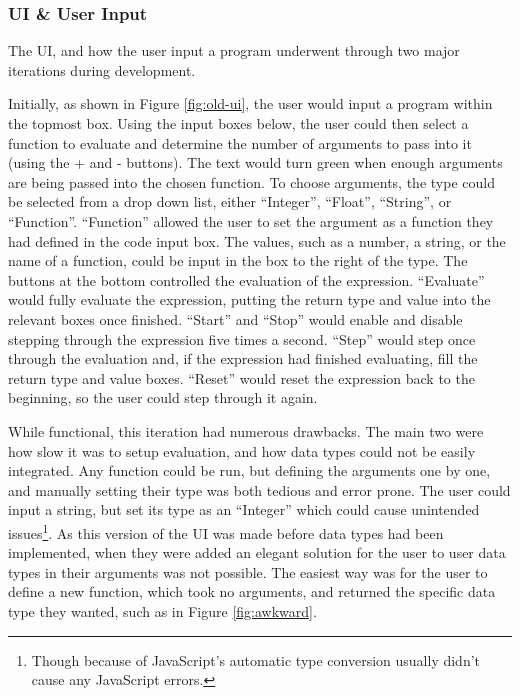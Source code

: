 \subsubsection{UI \& User Input}


The UI, and how the user input a program underwent through two major iterations during development.

Initially, as shown in Figure \ref{fig:old-ui}, the user would input a program within the topmost box. Using the input boxes below, the user could then select a function to evaluate and determine the number of arguments to pass into it (using the + and - buttons). The text would turn green when enough arguments are being passed into the chosen function. To choose arguments, the type could be selected from a drop down list, either ``Integer'', ``Float'', ``String'', or ``Function''. ``Function'' allowed the user to set the argument as a function they had defined in the code input box. The values, such as a number, a string, or the name of a function, could be input in the box to the right of the type.
The buttons at the bottom controlled the evaluation of the expression. ``Evaluate'' would fully evaluate the expression, putting the return type and value into the relevant boxes once finished.
``Start'' and ``Stop'' would enable and disable stepping through the expression five times a second.
``Step'' would step once through the evaluation and, if the expression had finished evaluating, fill the return type and value boxes.
``Reset'' would reset the expression back to the beginning, so the user could step through it again.

While functional, this iteration had numerous drawbacks. The main two were how slow it was to setup evaluation, and how data types could not be easily integrated. Any function could be run, but defining the arguments one by one, and manually setting their type was both tedious and error prone. The user could input a string, but set its type as an ``Integer'' which could cause unintended issues\footnote{Though because of JavaScript's automatic type conversion usually didn't cause any JavaScript errors.}.
As this version of the UI was made before data types had been implemented, when they were added an elegant solution for the user to user data types in their arguments was not possible. The easiest way was for the user to define a new function, which took no arguments, and returned the specific data type they wanted, such as in Figure \ref{fig:awkward}.


